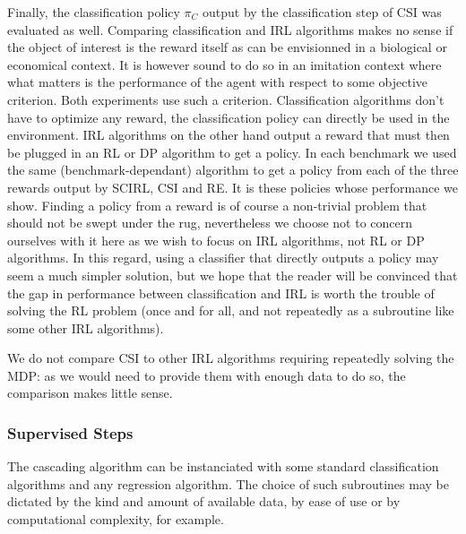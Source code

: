 \documentclass{llncs}
\begin{document}
Finally, the classification policy $\pi_C$ output by the classification step of CSI was evaluated as well. Comparing classification and IRL algorithms makes no sense if the object of interest is the reward itself as can be envisionned in a biological or economical context. It is however sound to do so in an imitation context where what matters is the performance of the agent with respect to some objective criterion. Both experiments use such a criterion. Classification algorithms don't have to optimize any reward, the classification policy can directly be used in the environment. IRL algorithms on the other hand output a reward that must then be plugged in an RL or DP algorithm to get a policy. In each benchmark we used the same (benchmark-dependant) algorithm to get a policy from each of the three rewards output by SCIRL, CSI and RE. It is these policies whose performance we show. Finding a policy from a reward is of course a non-trivial problem that should not be swept under the rug, nevertheless we choose not to concern ourselves with it here as we wish to focus on IRL algorithms, not RL or DP algorithms. In this regard, using a classifier that directly outputs a policy may seem a much simpler solution, but we hope that the reader will be convinced that the gap in performance between classification and IRL is worth the trouble of solving the RL problem (once and for all, and not repeatedly as a subroutine like some other IRL algorithms).

We do not compare CSI to other IRL algorithms requiring repeatedly solving the MDP: as we would need to provide them with enough data to do so, the comparison makes little sense.
\subsubsection{Supervised Steps}
\label{subsubsec:subroutines}
The cascading algorithm can be instanciated with some standard classification algorithms and any regression algorithm. The choice of such subroutines may be dictated by the kind and amount of available data, by ease of use or by computational complexity, for example.
\end{document}
